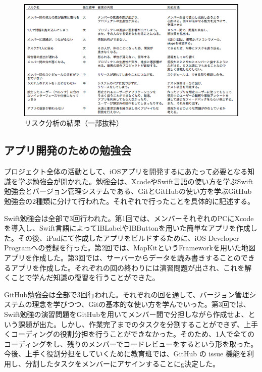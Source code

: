 \documentclass[openany,11pt,papersize]{jsbook}
\begin{document}
\begin{figure}[H]
\begin{center}
\includegraphics[width=14cm, bb=0 0 753 394]{img/RiskManagement.png}
\end{center}
\caption{リスク分析の結果（一部抜粋）}
\end{figure}


\subsection{アプリ開発のための勉強会}
\par プロジェクト全体の活動として、iOSアプリを開発するにあたって必要となる知識を学ぶ勉強会が開かれた。勉強会は、XcodeやSwift言語の使い方を学ぶSwift勉強会とバージョン管理システムである、GitとGitHubの使い方を学ぶGitHub勉強会の2種類に分けて行われた。それぞれで行ったことを具体的に記述する。
\par Swift勉強会は全部で3回行われた。第1回では、メンバーそれぞれのPCにXcodeを導入し、Swift言語によってIBLabelやIBButtonを用いた簡単なアプリを作成した。その後、iPadにて作成したアプリをビルドするために、iOS Developer Programへの登録を行った。第2回では、MapKitというFrameworkを用いた地図アプリを作成した。第3回では、サーバーからデータを読み書きすることのできるアプリを作成した。それぞれの回の終わりには演習問題が出され、これを解くことで学んだ知識の復習を行うことができた。
\par GitHub勉強会は全部で3回行われた。それぞれの回を通して、バージョン管理システムの理念を学びつつ、Gitの基本的な使い方を学んでいった。第3回では、Swift勉強の演習問題をGitHubを用いてメンバー間で分担しながら作成せよ、という課題が出た。しかし、作業完了までのタスクを分割することができず、上手くコーディングの役割分担を行うことができなかった。そのため、1人で全てのコーディングをし、残りのメンバーでコードレビューをするという形を取った。今後、上手く役割分担をしていくために教育班では、GitHub の issue 機能を利用し、分割したタスクをメンバーにアサインすることにg決定した。
\end{document}
